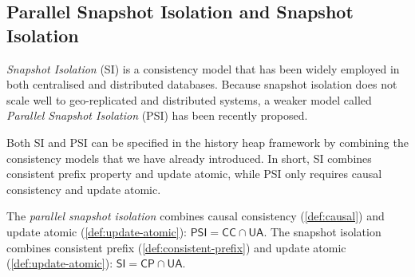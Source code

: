 \subsection{Parallel Snapshot Isolation and Snapshot Isolation}
\emph{Snapshot Isolation} (SI) is a consistency model that has been widely employed in both centralised and distributed databases. 
Because snapshot isolation does not scale well to geo-replicated and distributed systems, a weaker model called \emph{Parallel Snapshot Isolation} (PSI) has been recently proposed. 

Both SI and PSI can be specified in the history heap framework by combining the consistency models that we have already introduced. 
In short, SI combines consistent prefix property and update atomic, while PSI only requires causal consistency and update atomic.
\begin{definition}
The \emph{parallel snapshot isolation} combines causal consistency (\cref{def:causal})  and update atomic (\cref{def:update-atomic}): $\mathsf{PSI} = \mathsf{CC} \cap \mathsf{UA}$.
The {snapshot isolation} combines consistent prefix (\cref{def:consistent-prefix}) and update atomic (\cref{def:update-atomic}): $\mathsf{SI} = \mathsf{CP} \cap \mathsf{UA}$.
\end{definition}


